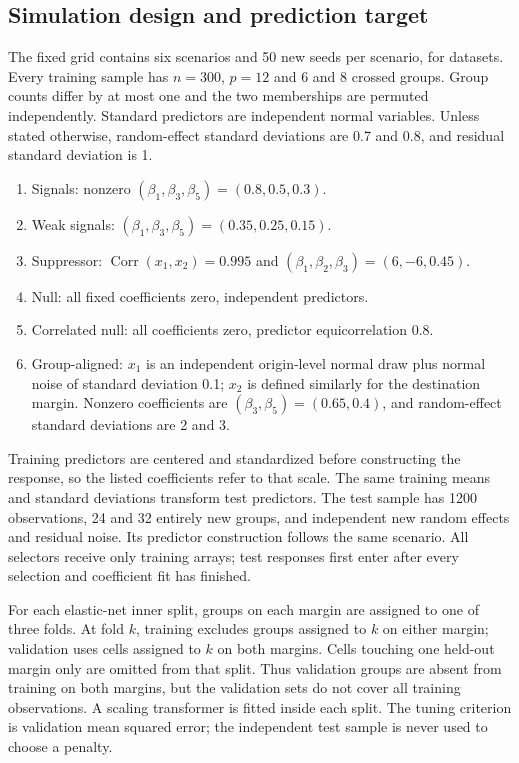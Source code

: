 \documentclass[11pt,a4paper]{article}
\theoremstyle{remark}\newtheorem{remark}[theorem]{Remark}
\begin{document}
\subsection{Simulation design and prediction target}
The fixed grid contains six scenarios and 50 new seeds per scenario, for
\ComparisonCases{} datasets. Every training sample has $n=300$, $p=12$ and
6 and 8 crossed groups. Group counts differ by at most one and the two
memberships are permuted independently. Standard predictors are independent
normal variables. Unless stated otherwise, random-effect standard deviations
are 0.7 and 0.8, and residual standard deviation is 1.
\begin{enumerate}
\item Signals: nonzero $(\beta_1,\beta_3,\beta_5)=(0.8,0.5,0.3)$.
\item Weak signals: $(\beta_1,\beta_3,\beta_5)=(0.35,0.25,0.15)$.
\item Suppressor: $\operatorname{Corr}(x_1,x_2)=0.995$ and
$(\beta_1,\beta_2,\beta_3)=(6,-6,0.45)$.
\item Null: all fixed coefficients zero, independent predictors.
\item Correlated null: all coefficients zero, predictor equicorrelation 0.8.
\item Group-aligned: $x_1$ is an independent origin-level normal draw plus
normal noise of standard deviation 0.1; $x_2$ is defined similarly for the
destination margin. Nonzero coefficients are $(\beta_3,\beta_5)=(0.65,0.4)$,
and random-effect standard deviations are 2 and 3.
\end{enumerate}
Training predictors are centered and standardized before constructing the
response, so the listed coefficients refer to that scale. The same training
means and standard deviations transform test predictors. The test sample has
1200 observations, 24 and 32 entirely new groups, and independent new random
effects and residual noise. Its predictor construction follows the same scenario.
All selectors receive only training arrays; test responses first enter after
every selection and coefficient fit has finished.

For each elastic-net inner split, groups on each margin are assigned to one
of three folds. At fold $k$, training excludes groups assigned to $k$ on either
margin; validation uses cells assigned to $k$ on both margins. Cells touching
one held-out margin only are omitted from that split. Thus validation groups
are absent from training on both margins, but the validation sets do not cover
all training observations. A scaling transformer is fitted inside each split.
The tuning criterion is validation mean squared error; the independent test
sample is never used to choose a penalty.
\end{document}
